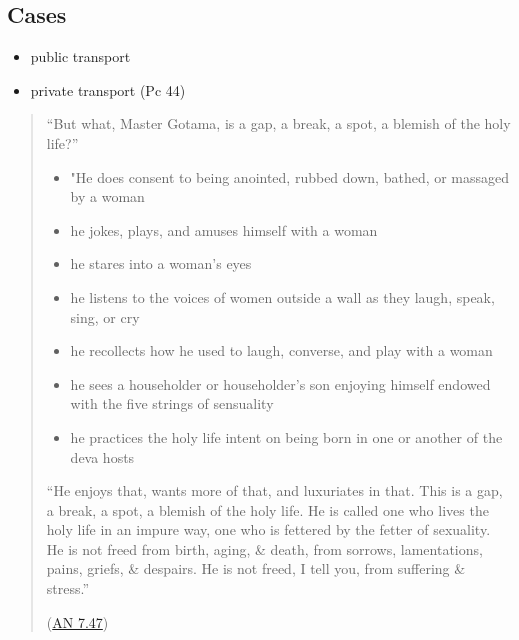 \subsection{Cases}

\begin{itemize}
\tightlist
\item
  public transport
\item
  private transport (Pc 44)
\end{itemize}

\clearpage

\begin{quote}
``But what, Master Gotama, is a gap, a break, a spot, a blemish of the
holy life?''

\begin{itemize}
\tightlist
\item
  "He does consent to being anointed, rubbed down, bathed, or massaged
  by a woman
\item
  he jokes, plays, and amuses himself with a woman
\item
  he stares into a woman's eyes
\item
  he listens to the voices of women outside a wall as they laugh, speak,
  sing, or cry
\item
  he recollects how he used to laugh, converse, and play with a woman
\item
  he sees a householder or householder's son enjoying himself endowed
  with the five strings of sensuality
\item
  he practices the holy life intent on being born in one or another of
  the deva hosts
\end{itemize}

``He enjoys that, wants more of that, and luxuriates in that. This is a
gap, a break, a spot, a blemish of the holy life. He is called one who
lives the holy life in an impure way, one who is fettered by the fetter
of sexuality. He is not freed from birth, aging, \& death, from sorrows,
lamentations, pains, griefs, \& despairs. He is not freed, I tell you,
from suffering \& stress.''

(\href{https://www.dhammatalks.org/suttas/AN/AN7_47.html}{AN 7.47})
\end{quote}

